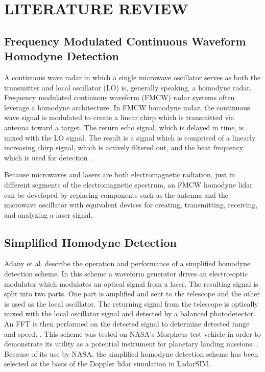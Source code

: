 %
%
%
%

\chapter{LITERATURE REVIEW}

\section{Frequency Modulated Continuous Waveform Homodyne Detection}
A continuous wave radar in which a single microwave oscillator serves as both
the transmitter and local oscillator (LO) is, generally speaking, a homodyne radar.
Frequency modulated continuous waveform (FMCW) radar systems often leverage a 
homodyne architecture. In FMCW homodyne radar, the continuous wave signal is modulated
to create a linear chirp which is transmitted via antenna toward a target. The return
echo signal, which is delayed in time, is mixed with the LO signal. The result is a signal 
which is comprised of a linearly increasing chirp signal, which is actively filtered out, and 
the beat frequency which is used for detection \cite{brooker2009}. 

Because microwaves and lasers are both electromagnetic radiation, just in different
segments of the electromagnetic spectrum, an FMCW homodyne lidar can be developed by 
replacing components such as the antenna and the microwave oscillator with equivalent 
devices for creating, transmitting, receiving, and analyzing a laser signal. 


\section{Simplified Homodyne Detection}
Adany et al.
describe the operation and performance of a simplified homodyne detection
scheme.
In this scheme a waveform generator drives an electro-optic modulator which
modulates an optical signal from a laser.
The resulting signal is split into two parts.
One part is amplified and sent to the telescope and the other is used as
the local oscillator.
The returning signal from the telescope is optically mixed with the local
oscillator signal and detected by a balanced photodetector.
An FFT is then performed on the detected signal to determine detected range
and speed.
\cite{adany09}.
This scheme was tested on NASA's Morpheus test vehicle in order to demonstrate
its utility as a potential instrument for planetary landing missions.
\cite{amz12,amz12p2,amz12fiber,amz16coherent}.
Because of its use by NASA, the simplified homodyne detection scheme has
been selected as the basis of the Doppler lidar simulation in LadarSIM.

